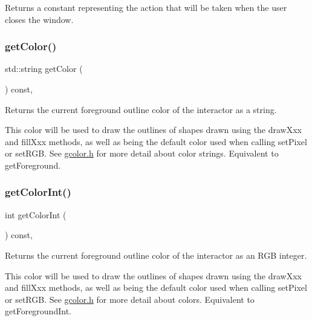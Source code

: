 Returns a constant representing the action that will be taken when the user closes the window. 

\mbox{\label{classGDrawingSurface_aa061dfa488c31e18549d64363c1d0e34}} 
\subsubsection{\texorpdfstring{get\+Color()}{getColor()}}
{\footnotesize\ttfamily std\+::string get\+Color (\begin{DoxyParamCaption}{ }\end{DoxyParamCaption}) const\hspace{0.3cm}{\ttfamily [virtual]}, {\ttfamily [inherited]}}



Returns the current foreground outline color of the interactor as a string. 

This color will be used to draw the outlines of shapes drawn using the draw\+Xxx and fill\+Xxx methods, as well as being the default color used when calling set\+Pixel or set\+R\+GB. See \mbox{\hyperlink{gcolor_8h_source}{gcolor.\+h}} for more detail about color strings. Equivalent to get\+Foreground. \mbox{\label{classGDrawingSurface_a9635c7af766cdc3417f346683fa0e6c1}} 
\subsubsection{\texorpdfstring{get\+Color\+Int()}{getColorInt()}}
{\footnotesize\ttfamily int get\+Color\+Int (\begin{DoxyParamCaption}{ }\end{DoxyParamCaption}) const\hspace{0.3cm}{\ttfamily [virtual]}, {\ttfamily [inherited]}}



Returns the current foreground outline color of the interactor as an R\+GB integer. 

This color will be used to draw the outlines of shapes drawn using the draw\+Xxx and fill\+Xxx methods, as well as being the default color used when calling set\+Pixel or set\+R\+GB. See \mbox{\hyperlink{gcolor_8h_source}{gcolor.\+h}} for more detail about colors. Equivalent to get\+Foreground\+Int. \mbox{\label{classGWindow_a43cda7f9c8a6eb4ff1519fb99a3c2901}} 
